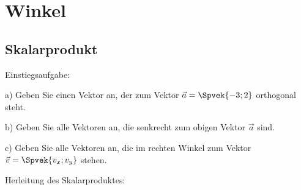 \section{Winkel}


\subsection{Skalarprodukt}


Einstiegsaufgabe:

a) Geben Sie einen Vektor an, der zum Vektor $\vec{a} = \Spvek{-3;2}$
orthogonal steht.

b) Geben Sie alle Vektoren an, die senkrecht zum obigen Vektor $\vec{a}$ sind.

c) Geben Sie alle Vektoren an, die im rechten Winkel zum Vektor $\vec{v} = \Spvek{v_x;
  v_y}$ stehen.



\newpage
Herleitung des Skalarproduktes:




